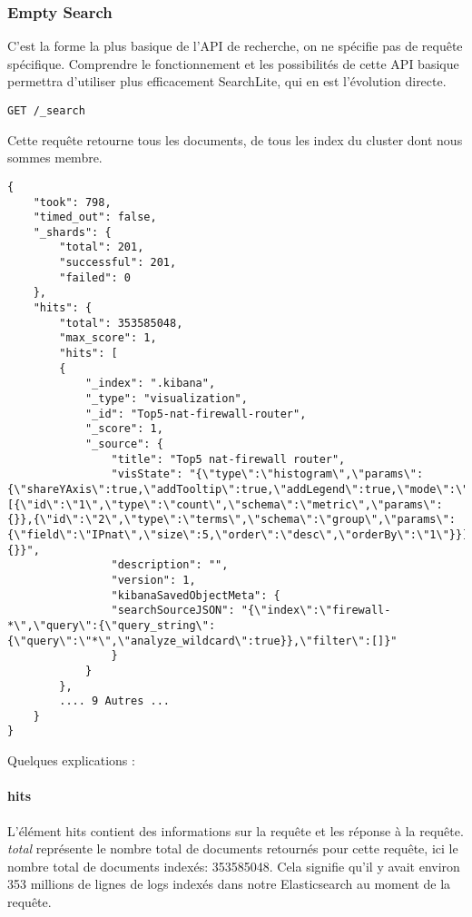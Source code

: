 {\subsubsection{Empty Search}
C'est la forme la plus basique de l'API de recherche, on ne spécifie pas de requête
spécifique. Comprendre le fonctionnement et les possibilités de cette API basique 
permettra d'utiliser plus efficacement SearchLite, qui en est l'évolution directe.


\begin{lstlisting}[style=code,label={lst:APIsearchemptyexample1},caption={le "Hello World" de la recherche}]
GET /_search
\end{lstlisting}

Cette requête retourne tous les documents, de tous les index du cluster dont nous
sommes membre.

\begin{lstlisting}[style=code,label={lst:APIsearchemptyexample2},caption={Réponse type à notre requête précédente}]
{
    "took": 798,
    "timed_out": false,
    "_shards": {
        "total": 201,
        "successful": 201,
        "failed": 0
    },
    "hits": {
        "total": 353585048,
        "max_score": 1,
        "hits": [
        {
            "_index": ".kibana",
            "_type": "visualization",
            "_id": "Top5-nat-firewall-router",
            "_score": 1,
            "_source": {
                "title": "Top5 nat-firewall router",
                "visState": "{\"type\":\"histogram\",\"params\":{\"shareYAxis\":true,\"addTooltip\":true,\"addLegend\":true,\"mode\":\"stacked\",\"defaultYExtents\":false},\"aggs\":[{\"id\":\"1\",\"type\":\"count\",\"schema\":\"metric\",\"params\":{}},{\"id\":\"2\",\"type\":\"terms\",\"schema\":\"group\",\"params\":{\"field\":\"IPnat\",\"size\":5,\"order\":\"desc\",\"orderBy\":\"1\"}}],\"listeners\":{}}",
                "description": "",
                "version": 1,
                "kibanaSavedObjectMeta": {
                "searchSourceJSON": "{\"index\":\"firewall-*\",\"query\":{\"query_string\":{\"query\":\"*\",\"analyze_wildcard\":true}},\"filter\":[]}"
                }
            }
        },
        .... 9 Autres ...
    }
}
\end{lstlisting}

Quelques explications :

\paragraph{hits}
L'élément hits contient des informations sur la requête et les réponse à la requête.
\textit{total} représente le nombre total de documents retournés pour cette requête, ici le 
nombre total de documents indexés: 353585048. 
Cela signifie qu'il y avait environ 353 millions de lignes
de logs indexés dans notre Elasticsearch au moment de la requête.

}
